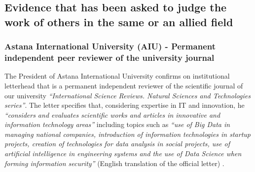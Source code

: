 

\subsection{Evidence that \mrl has been asked to judge the work of others in the same or an allied field}

\label{subsec:Judging}

\subsubsection{Astana International University (AIU) - Permanent independent peer reviewer of the university journal}

\label{subsubsec:JudgingAIU}

The President of Astana International University confirms on institutional letterhead that \mrl{} is a permanent independent reviewer of the scientific journal of our university \emph{``International Science Reviews. Natural Sciences and Technologies series''}. The letter specifies that, considering \mrls expertise in IT and innovation, he \emph{``considers and evaluates scientific works and articles in innovative and information technology areas''} including topics such as \emph{``use of Big Data in managing national companies, introduction of information technologies in startup projects, creation of technologies for data analysis in social projects, use of artificial intelligence in engineering systems and the use of Data Science when forming information security''} (English translation of the official letter) .


